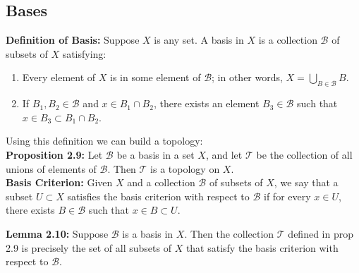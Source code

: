 \documentclass{article}
\begin{document}
\subsection{Bases}
\textbf{Definition of Basis:} Suppose $X$ is any set. A basis in $X$ is a collection $\mathcal{B}$ of subsets of $X$ satisfying:
\begin{enumerate}
    \item Every element of $X$ is in some element of $\mathcal{B}$; in other words,
    $X=\bigcup_{B\in\mathcal{B}}B$.
    \item If $B_1,B_2\in \mathcal{B}$ and $x\in B_1\cap B_2$, there exists an element $B_3\in \mathcal{B}$ such that $x\in B_3\subset B_1\cap B_2$.
\end{enumerate}
Using this definition we can build a topology:\\
\textbf{Proposition 2.9:} Let $\mathcal{B}$ be a basis in a set $X$, and let $\mathcal{T}$ be the collection of all unions of elements of $\mathcal{B}$. Then $\mathcal{T}$ is a topology on $X$.\\
\textbf{Basis Criterion:} Given $X$ and a collection $\mathcal{B}$ of subsets of $X$, we say that a subset $U\subset X$ satisfies the basis criterion with respect to $\mathcal{B}$ if for every $x\in U$, there exists $B\in\mathcal{B}$ such that $x\in B \subset U$.

\textbf{Lemma 2.10: } Suppose $\mathcal{B}$ is a basis in $X$. Then the collection $\mathcal{T}$ defined in prop 2.9 is precisely the set of all subsets of $X$ that satisfy the basis criterion with respect to $\mathcal{B}$.\\
\end{document}
